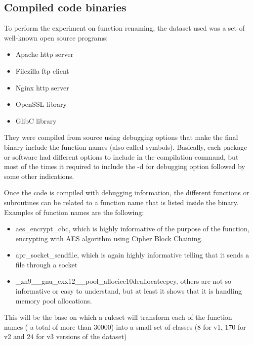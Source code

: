 
\newpage
\begin{appendices}

\section{Compiled code binaries}\label{annex:compilation}

To perform the experiment on function renaming, the dataset used was a set of well-known open source programs:
\begin{itemize}
	\item Apache http server
	\item Filezilla ftp client
	\item Nginx http server
	\item OpenSSL library
	\item GlibC library
\end{itemize}


They were compiled from source using debugging options that make the final binary include the function names (also called symbols). Basically, each package or software had different options to include in the compilation command, but most of the times it required to include the -d for debugging option followed by some other indications. 


Once the code is compiled with debugging information, the different functions or subroutines can be related to a function name that is listed inside the binary. Examples of function names are the following:

\begin{itemize}
\item aes\_encrypt\_cbc, which is highly informative of the purpose of the function, encrypting with AES algorithm using Cipher Block Chaining.
\item apr\_socket\_sendfile, which is again highly informative telling that it sends a file through a socket
\item \_zn9\_\_gnu\_cxx12\_\_pool\_allocice10deallocateepcy, others are not so informative or easy to understand, but at least it shows that it is handling memory pool allocations.
\end{itemize}

This will be the base on which a ruleset will transform each of the function names ( a total of more than 30000) into a small set of classes (8 for v1, 170 for v2 and 24 for v3 versions of the dataset)







\end{appendices}
